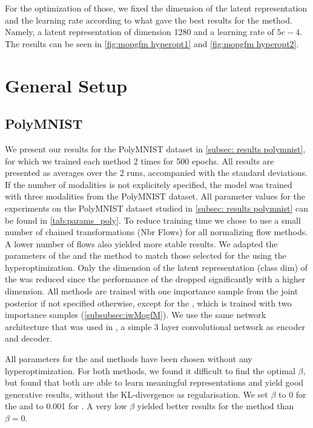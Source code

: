 For the optimization of those, we fixed the dimension of the latent representation and the learning rate according to what gave the best results for the  method.
Namely, a latent representation of dimension 1280 and a learning rate of $5e-4$.
The results can be seen in \cref{fig:mopgfm hyperopt1} and \cref{fig:mopgfm hyperopt2}.


\section{General Setup}

\subsection{PolyMNIST}
We present our results for the PolyMNIST dataset in \cref{subsec: results polymnist}, for which we trained each method 2 times for 500 epochs.
All results are presented as averages over the 2 runs, accompanied with the standard deviations.
If the number of modalities is not explicitely specified, the model was trained with three modalities from the PolyMNIST dataset.
All parameter values for the experiments on the PolyMNIST dataset studied in \cref{subsec: results polymnist} can be found in \cref{tab:params_poly}.
To reduce training time we chose to use a small number of chained transformations (Nbr Flows) for all normalizing flow methods.
A lower number of flows also yielded more stable results.
We adapted the parameters of the  and the  method to match those selected for the  using the hyperoptimization.
Only the dimension of the latent representation (class dim) of the  was reduced since the performance of the  dropped significantly with a higher dimension.
All methods are trained with one importance sample from the joint posterior if not specified otherwise, except for the , which is trained with two importance samples (\cref{subsubsec:iwMogfM}).
We use the same network architecture that was used in \citep{sutter_generalized_2020}, a simple 3 layer convolutional network as encoder and decoder.

All parameters for the  and  methods have been chosen without any hyperoptimization.
For both methods, we found it difficult to find the optimal $\beta$, but found that both are able to learn meaningful representations and yield good generative results, without the KL-divergence as regularisation.
We set $\beta$ to 0 for the  and to 0.001 for .
A very low $\beta$ yielded better results for the  method than $\beta = 0$.




